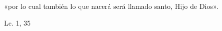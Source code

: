 \documentclass[../../rosario.tex]{subfiles}
\begin{document}
    «por lo cual también lo que nacerá será llamado santo, Hijo de Dios».
    \begin{flushright}
    Lc. 1, 35
    \end{flushright}
\end{document}
